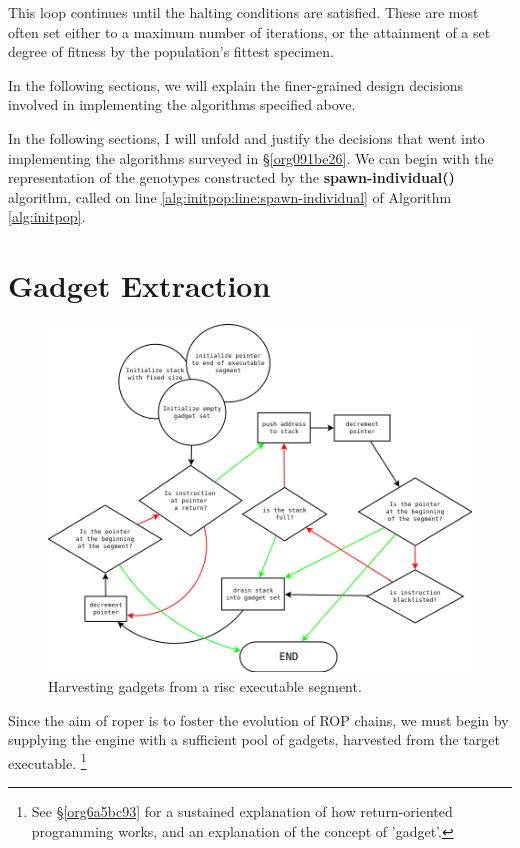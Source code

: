 \documentclass[12pt,glossary]{dalthesis}
\begin{document}
This loop continues until the halting conditions are satisfied. These are most
often set either to a maximum number of iterations, or the attainment of a set
degree of fitness by the population's fittest specimen.

In the following sections, we will explain the finer-grained design decisions
involved in implementing the algorithms specified above. 

In the following sections, I will unfold and justify the decisions that went into
implementing the algorithms surveyed in \S \ref{org091be26}.
We can begin with the representation of the genotypes constructed by
the \textbf{spawn-individual()} algorithm, called on line
\ref{alg:initpop:line:spawn-individual} of Algorithm \ref{alg:initpop}.

\section{Gadget Extraction}
\label{sec:org1220a55}
\label{orgec13709}

\begin{figure}[htbp]
\centering
\includegraphics[width=.9\linewidth]{../images/gadget-harvest-dark.png}
\caption{\label{fig:org2481827}
Harvesting gadgets from a \gls{risc} executable segment.}
\end{figure}

Since the aim of \gls{roper} is to foster the evolution of ROP chains, we 
must begin by supplying the engine with a sufficient pool of gadgets, 
harvested from the target executable. 
  \footnote{See \S \ref{org6a5bc93} for a sustained explanation of how return-oriented
  programming works, and an explanation of the concept of 'gadget'.}
\end{document}
